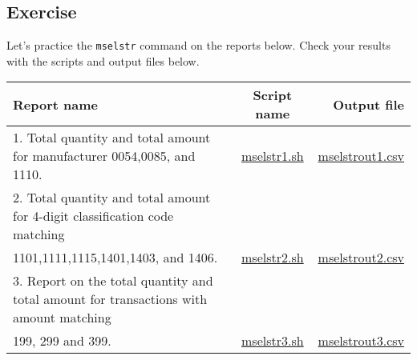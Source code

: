 \subsection{Exercise }

Let's practice the \verb|mselstr| command on the reports below. Check your results with the scripts and output files below. 

\begin{table}[htbp]
{\small
\begin{tabular}{ l | c || r }
\hline
\textbf{Report name}   & \textbf{Script name} & \textbf{Output file}  \\
\hline
1. Total quantity and total amount for manufacturer 0054,0085, and 1110. & \href{exercise/mselstr1.sh}{mselstr1.sh} & \href{exercise/outdat/mselstrout1.csv}{mselstrout1.csv} \\
2. Total quantity and total amount for 4-digit classification code matching \\1101,1111,1115,1401,1403, and 1406. & \href{exercise/mselstr2.sh}{mselstr2.sh} & \href{exercise/outdat/mselstrout2.csv}{mselstrout2.csv} \\
3. Report on the total quantity and total amount for transactions with amount matching \\ 199, 299 and 399. & \href{exercise/mselstr3.sh}{mselstr3.sh} & \href{exercise/outdat/mselstrout3.csv}{mselstrout3.csv} \\

\hline
\end{tabular} 
}
\end{table} 


%
